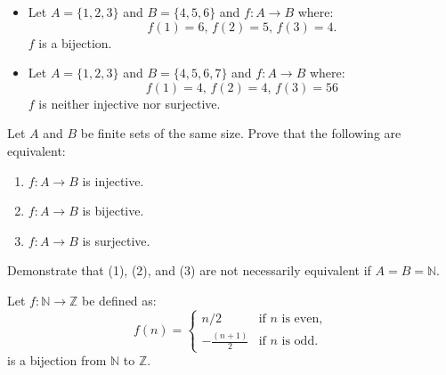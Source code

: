 \documentclass[11pt]{article}
\begin{document}
\begin{itemize}
    \item Let $A = \{1, 2, 3\}$ and $B = \{4, 5, 6\}$ and $f : A \to B$ where:
          \[
              f(1) = 6, \, f(2) = 5, \, f(3) = 4.
          \]
          $f$ is a bijection.
    \item Let $A = \{1, 2, 3\}$ and $B = \{4, 5, 6, 7\}$ and $f : A \to B$ where:
          \[
              f(1) = 4, \, f(2) = 4, \, f(3) = 56
          \]
          $f$ is neither injective nor surjective.

\end{itemize}
\begin{question*}
    Let $A$ and $B$ be finite sets of the same size. Prove that the following are
    equivalent:
    \begin{enumerate}
        \item $f : A \to B$ is injective.
        \item $f : A \to B$ is bijective.
        \item $f : A \to B$ is surjective.
    \end{enumerate}
    Demonstrate that (1), (2), and (3) are not necessarily equivalent if $A = B = \mathbb{N}$.
\end{question*}
\begin{example}
    Let $f : \mathbb{N} \to \mathbb{Z}$ be defined as:
    \[
        f(n) =
        \begin{cases}
            n / 2              & \text{if } n \text{ is even}, \\
            -\frac{(n + 1)}{2} & \text{if } n \text{ is odd}.
        \end{cases}
    \]
    is a bijection from $\mathbb{N}$ to $\mathbb{Z}$.
\end{example}
\end{document}
